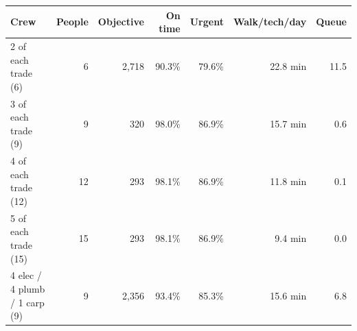 \begin{tabular}{lrrrrrr}
\toprule
\textbf{Crew} & \textbf{People} & \textbf{Objective} & \textbf{On time} & \textbf{Urgent} & \textbf{Walk/tech/day} & \textbf{Queue} \\
\midrule
2 of each trade (6) & 6 & 2,718 & 90.3\% & 79.6\% & 22.8 min & 11.5 \\
3 of each trade (9) & 9 & 320 & 98.0\% & 86.9\% & 15.7 min & 0.6 \\
4 of each trade (12) & 12 & 293 & 98.1\% & 86.9\% & 11.8 min & 0.1 \\
5 of each trade (15) & 15 & 293 & 98.1\% & 86.9\% & 9.4 min & 0.0 \\
4 elec / 4 plumb / 1 carp (9) & 9 & 2,356 & 93.4\% & 85.3\% & 15.6 min & 6.8 \\
\bottomrule
\end{tabular}
